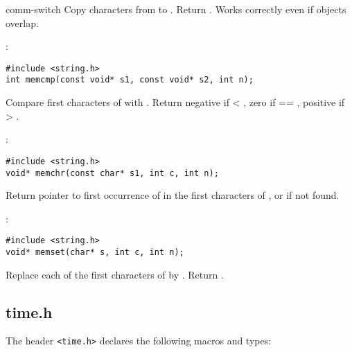 \begin{Ventry2}{comm-switch  }
     Copy  characters from  to . Return
     . Works correctly even if objects overlap.

\item[memcmp]
\label{item:memcmp}
:
\begin{production}
\begin{verbatim}
#include <string.h>
int memcmp(const void* s1, const void* s2, int n);
\end{verbatim}
\end{production}

     Compare first  characters of  with . Return
     negative if  < , zero if  == , positive
     if  > .

\item[memchr]
\label{item:memchr}
:
\begin{production}
\begin{verbatim}
#include <string.h>
void* memchr(const char* s1, int c, int n);
\end{verbatim}
\end{production}

     Return pointer to first occurrence of  in the first  characters
     of , or  if not found.

\item[memset]
\label{item:memset}
:
\begin{production}
\begin{verbatim}
#include <string.h>
void* memset(char* s, int c, int n);
\end{verbatim}
\end{production}

     Replace each of the first  characters of  by . Return .

\end{Ventry2}

\subsection{time.h}
\label{sec:timeh}

The header \verb+<time.h>+ declares the following macros and types:


